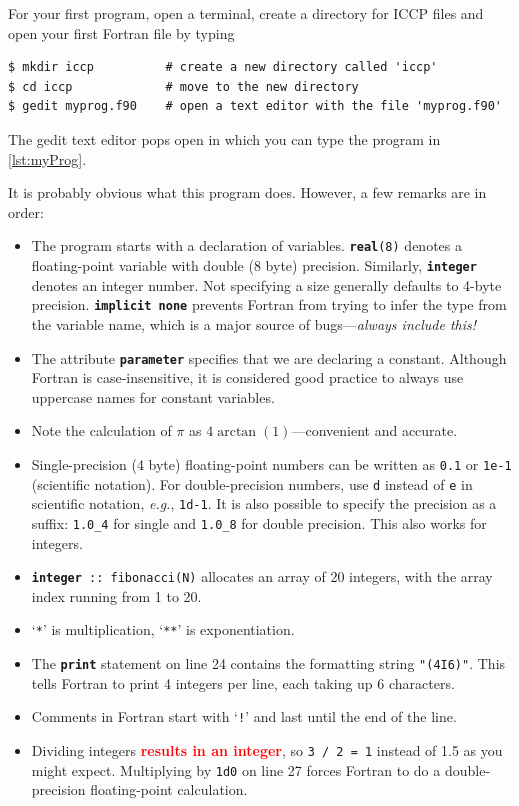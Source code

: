 \documentclass[openany,oneside]{report}
\newcommand{\keyword}[1]{\texttt{\bfseries\color{DarkBlue}#1}}
\newcommand{\str}[1]{\texttt{\color{DarkRed}#1}}
\begin{document}
For your first program, open a terminal, create a directory for ICCP files and open your first Fortran file by typing
\begin{verbatim}
$ mkdir iccp          # create a new directory called 'iccp'
$ cd iccp             # move to the new directory
$ gedit myprog.f90    # open a text editor with the file 'myprog.f90'
\end{verbatim}
The gedit text editor pops open in which you can type the program in \autoref{lst:myProg}.

It is probably obvious what this program does. However, a few remarks are in order:
\begin{itemize}
  \item The program starts with a declaration of variables.
    \texttt{\keyword{real}(8)} denotes a floating-point variable with double (8 byte) precision. 
    Similarly, \keyword{integer} denotes an integer number.
    Not specifying a size generally defaults to 4-byte precision.
    \keyword{implicit none} prevents Fortran from trying to infer the type from the variable name, which is a major source of bugs---\emph{always include this!}
  \item The attribute \keyword{parameter} specifies that we are declaring a constant.
    Although Fortran is case-insensitive, it is considered good practice to always use uppercase names for constant variables.
  \item Note the calculation of $\pi$ as $4\arctan(1)$---convenient and accurate.
  \item Single-precision (4 byte) floating-point numbers can be written as \texttt{0.1} or \texttt{1e-1} (scientific notation). 
    For double-precision numbers, use \texttt{d} instead of \texttt{e} in scientific notation, \emph{e.g.}, \texttt{1d-1}. 
    It is also possible to specify the precision as a suffix: \texttt{1.0\_4} for single and \texttt{1.0\_8} for double precision. 
    This also works for integers.
  \item \texttt{\keyword{integer} :: fibonacci(N)} allocates an array of 20 integers, with the array index running from 1 to 20.
  \item `\texttt{*}' is multiplication, `\texttt{**}' is exponentiation.
  \item The \keyword{print} statement on line 24 contains the formatting string \str{"(4I6)"}. 
    This tells Fortran to print 4 integers per line, each taking up 6 characters.
  \item Comments in Fortran start with `\texttt{!}' and last until the end of the line.
  \item Dividing integers \textcolor{red}{\textbf{results in an integer}}, so \texttt{3 / 2 = 1} instead of 1.5 as you might expect. 
    Multiplying by \texttt{1d0} on line 27 forces Fortran to do a double-precision floating-point calculation.
\end{itemize}
\end{document}
